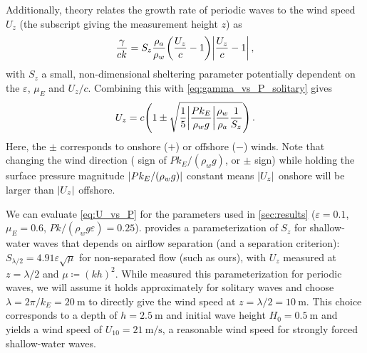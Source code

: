 \documentclass{jfm}
\renewcommand*{\epsilon}{\varepsilon}
\begin{document}
Additionally, \citet{jeffreys1925formation} theory relates the growth
rate of periodic waves to the wind speed $U_z$ (the subscript giving the
measurement height $z$) as
\begin{equation}
  \frac{\gamma}{c k} = S_z \frac{\rho_a}{\rho_w}
    \pqty{\frac{U_z}{c}-1} \abs{\frac{U_z}{c}-1} \,,
  \label{eq:gamma_vs_u_jeffreys}
\end{equation}
with $S_z$ a small, non-dimensional sheltering parameter potentially
dependent on the $\epsilon$, $\mu_E$ and $U_z/c$.
Combining this with \cref{eq:gamma_vs_P_solitary} gives
\begin{equation}
  U_z = c \pqty{1 \pm \sqrt{\frac{1}{5} \abs{\frac{P k_E}{\rho_w g}}
    \frac{\rho_w}{\rho_a} \frac{1}{S_z}}} \,.
  \label{eq:U_vs_P}
\end{equation}
Here, the $\pm$ corresponds to onshore ($+$) or offshore ($-$) winds.
Note that changing the wind direction (\ie{} sign of $Pk_E/(\rho_w g)$,
or $\pm$ sign) while holding the surface pressure magnitude
$\abs{Pk_E/(\rho_w g)}$ constant means $\abs{U_z}$ onshore will be
larger than $\abs{U_z}$ offshore.

We can evaluate \cref{eq:U_vs_P} for the parameters used in
\cref{sec:results} ($\epsilon=0.1$, $\mu_E = 0.6$, $Pk/(\rho_w g
\epsilon) = 0.25$).
 provides a parameterization of $S_z$ for
shallow-water waves that depends on airflow separation (and a separation
criterion): $S_{\lambda/2} = 4.91 \epsilon \sqrt{\mu}$ for non-separated
flow (such as ours), with $U_z$ measured at $z=\lambda/2$ and $\mu
\coloneqq (kh)^2$.
While \citet{donelan2006wave} measured this parameterization for
periodic waves, we will assume it holds approximately for solitary waves
and choose $ \lambda = 2 \pi/k_E =
\SI{20}{\meter}$ to directly give the wind speed at $z = \lambda/2 =
\SI{10}{\meter}$.
This choice corresponds to a depth of $h = \SI{2.5}{\meter}$ and initial
wave height $H_0 = \SI{0.5}{\meter}$ and yields a wind speed of $U_{10}
= \SI{21}{\meter\per\second}$, a reasonable wind speed for strongly
forced shallow-water waves.
\end{document}
